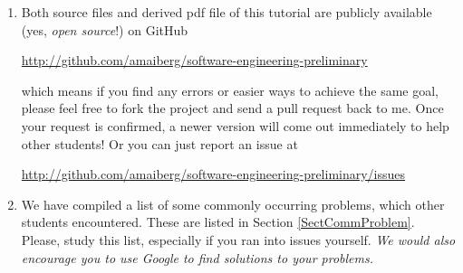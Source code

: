 \documentclass[oneside]{memoir}
\begin{document}
\begin{titlingpage}
\begin{minipage}{1.2\textwidth}
\begin{enumerate}
\item Both source files and derived pdf file of this tutorial are publicly
available (yes, \emph{open source}!) on GitHub

\url{http://github.com/amaiberg/software-engineering-preliminary}

which means if you find any errors or easier ways to achieve the same goal,
please feel free to fork the project and send a pull request back to me. Once
your request is confirmed, a newer version will come out immediately to help
other students! Or you can just report an issue at

\url{http://github.com/amaiberg/software-engineering-preliminary/issues}

\item We have compiled a list of some commonly occurring problems, which
other students encountered. These are listed in Section \ref{SectCommProblem}.
Please, study this list, especially if you ran into issues yourself. 
\emph{We would also encourage you to use Google to find solutions to your problems.}

\end{enumerate}

\end{minipage}
\hspace{-0.1\textwidth}
\end{titlingpage}







\titleformat{\section}{\normalfont\Large\bfseries}{\thesection}{1em}{}

\end{document}
